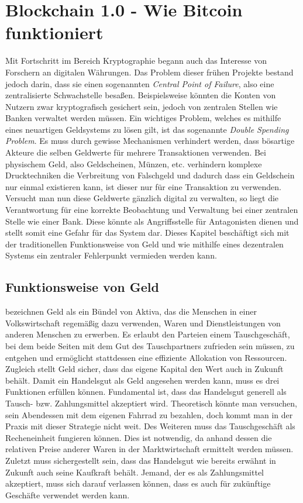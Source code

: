 \chapter{Blockchain 1.0 - Wie Bitcoin funktioniert}
Mit Fortschritt im Bereich Kryptographie begann auch das Interesse von Forschern an digitalen Währungen. 
Das Problem dieser frühen Projekte bestand jedoch darin, dass sie einen sogenannten \emph{Central Point of Failure}, also eine zentralisierte Schwachstelle besaßen. 
Beispielsweise könnten die Konten von Nutzern zwar kryptografisch gesichert sein, jedoch von zentralen Stellen wie Banken verwaltet werden müssen.
Ein wichtiges Problem, welches es mithilfe eines neuartigen Geldsystems zu lösen gilt, ist das sogenannte \emph{Double Spending Problem}. Es muss durch gewisse Mechanismen verhindert werden, dass bösartige Akteure die selben Geldwerte für mehrere Transaktionen verwenden. Bei physischem Geld, also Geldscheinen, Münzen, etc. verhindern komplexe Drucktechniken die Verbreitung von Falschgeld und dadurch dass ein Geldschein nur einmal existieren kann, ist dieser nur für eine Transaktion zu verwenden.
Versucht man nun diese Geldwerte gänzlich digital zu verwalten, so liegt die Verantwortung für eine korrekte Beobachtung und Verwaltung bei einer zentralen Stelle wie einer Bank. Diese könnte als Angriffsstelle für Antagonisten dienen und stellt somit eine Gefahr für das System dar.
Dieses Kapitel beschäftigt sich mit der traditionellen Funktionsweise von Geld und wie mithilfe eines dezentralen Systems ein zentraler Fehlerpunkt vermieden werden kann. 
\section{Funktionsweise von Geld}
\cite{mankiw_taylor_2018} bezeichnen Geld als ein Bündel von Aktiva, das die Menschen in einer Volkswirtschaft regemäßig dazu verwenden, Waren und Dienstleistungen von anderen Menschen zu erwerben.
Es erlaubt den Parteien einem Tauschgeschäft, bei dem beide Seiten mit dem Gut des Tauschpartners zufrieden sein müssen, zu entgehen und ermöglicht stattdessen eine effiziente Allokation von Ressourcen. Zugleich stellt Geld sicher, dass das eigene Kapital den Wert auch in Zukunft behält.
Damit ein Handelsgut als Geld angesehen werden kann, muss es drei Funktionen erfüllen können.
Fundamental ist, dass das Handelsgut generell als Tausch- bzw. Zahlungsmittel akzeptiert wird. Theoretisch könnte man versuchen, sein Abendessen mit dem eigenen Fahrrad zu bezahlen, doch kommt man in der Praxis mit dieser Strategie nicht weit.
Des Weiteren muss das Tauschgeschäft als Recheneinheit fungieren können. Dies ist notwendig, da anhand dessen die relativen Preise anderer Waren in der Marktwirtschaft ermittelt werden müssen.
Zuletzt muss sichergestellt sein, dass das Handelsgut wie bereits erwähnt in Zukunft auch seine Kaufkraft behält. Jemand, der es als Zahlungsmittel akzeptiert, muss sich darauf verlassen können, dass es auch für zukünftige Geschäfte verwendet werden kann.\\

